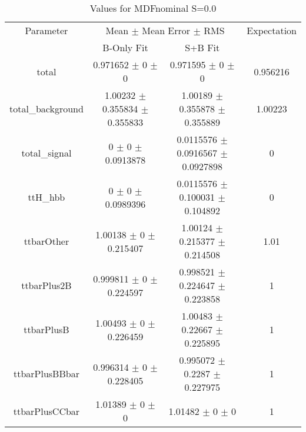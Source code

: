 \begin{table}
\centering
\caption{Values for MDFnominal S=0.0}
\begin{tabular}{cccc}
\toprule
Parameter & \multicolumn{2}{c}{Mean $\pm$ Mean Error $\pm$ RMS} & Expectation\\
 & B-Only Fit & S+B Fit & \\
\midrule
total & \num{0.971652} $\pm$ \num{0} $\pm$ \num{0} & \num{0.971595} $\pm$ \num{0} $\pm$ \num{0} & \num{0.956216}\\
total\_background & \num{1.00232} $\pm$ \num{0.355834} $\pm$ \num{0.355833} & \num{1.00189} $\pm$ \num{0.355878} $\pm$ \num{0.355889} & \num{1.00223}\\
total\_signal & \num{0} $\pm$ \num{0} $\pm$ \num{0.0913878} & \num{0.0115576} $\pm$ \num{0.0916567} $\pm$ \num{0.0927898} & \num{0}\\
ttH\_hbb & \num{0} $\pm$ \num{0} $\pm$ \num{0.0989396} & \num{0.0115576} $\pm$ \num{0.100031} $\pm$ \num{0.104892} & \num{0}\\
ttbarOther & \num{1.00138} $\pm$ \num{0} $\pm$ \num{0.215407} & \num{1.00124} $\pm$ \num{0.215377} $\pm$ \num{0.214508} & \num{1.01}\\
ttbarPlus2B & \num{0.999811} $\pm$ \num{0} $\pm$ \num{0.224597} & \num{0.998521} $\pm$ \num{0.224647} $\pm$ \num{0.223858} & \num{1}\\
ttbarPlusB & \num{1.00493} $\pm$ \num{0} $\pm$ \num{0.226459} & \num{1.00483} $\pm$ \num{0.22667} $\pm$ \num{0.225895} & \num{1}\\
ttbarPlusBBbar & \num{0.996314} $\pm$ \num{0} $\pm$ \num{0.228405} & \num{0.995072} $\pm$ \num{0.2287} $\pm$ \num{0.227975} & \num{1}\\
ttbarPlusCCbar & \num{1.01389} $\pm$ \num{0} $\pm$ \num{0} & \num{1.01482} $\pm$ \num{0} $\pm$ \num{0} & \num{1}\\
\bottomrule
\end{tabular}
\end{table}